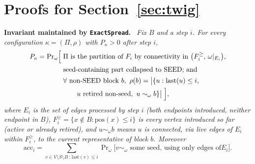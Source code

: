 \documentclass[preprint,11pt]{elsarticle}
\theoremstyle{definition}
\theoremstyle{remark}
\newenvironment{repeatlemma}[1][]{\par\medskip\noindent\textbf{#1.}\ \itshape}{\par\medskip}
\begin{document}
\appendix
{}
\renewcommand{\thetable}{\Alph{section}.\arabic{table}}
\renewcommand{\thefigure}{\Alph{section}.\arabic{figure}}
\renewcommand{\theequation}{\Alph{section}.\arabic{equation}}
\section{Proofs for Section~\ref{sec:twig}}\label{ec:twig-proofs}

\begin{repeatlemma}[Invariant maintained by \texttt{ExactSpread}]\label{ec:lem:invariant}
Fix $B$ and a step $i$. For every configuration $\kappa=(\Pi,\rho)$ with
$P_\kappa>0$ after step $i$,
\begin{align*}
P_\kappa=\Pr\nolimits_\omega\Bigl[\;&\Pi\text{ is the partition of }F_i\text{
by connectivity in }\bigl(F_i^{\ge},\,\omega|_{E_i}\bigr),\\
&\text{seed-containing part collapsed to SEED; and}\\
&\forall\text{ non-SEED block }b,\ \rho(b)=\bigl|
\{u:\mathrm{last}(u)\le i,\\
&\qquad u\text{ retired non-seed},\ u\sim_\omega b\}
\bigr|\;\Bigr],
\end{align*}
where $E_i$ is the set of edges processed by step $i$ (both endpoints
introduced, neither endpoint in $B$), $F_i^{\ge}=\{x\notin B:\mathrm{pos}(x)
\le i\}$ is every vertex introduced so far (active or already retired), and
$u\sim_\omega b$ means $u$ is connected, via live edges of $E_i$ within
$F_i^{\ge}$, to the current representative of block $b$. Moreover
$$\mathrm{acc}_i=\sum_{v\in V\setminus S\setminus B\,:\,\mathrm{last}(v)\le
i}\Pr\nolimits_\omega\bigl[v\sim_\omega\text{ some seed, using only edges of
}E_i\bigr].$$
\end{repeatlemma}
\end{document}
